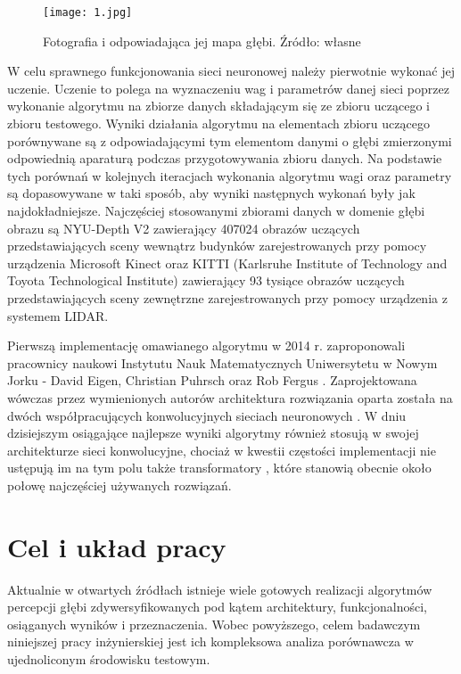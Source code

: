 \begin{figure}[H]
        \centering
        \texttt{[image: 1.jpg]}
        \caption{Fotografia i odpowiadająca jej mapa głębi. Źródło: własne}
        \label{fig:depthmap}
 \end{figure}

W celu sprawnego funkcjonowania sieci neuronowej należy pierwotnie wykonać jej uczenie. Uczenie to polega na wyznaczeniu wag i parametrów danej sieci poprzez wykonanie algorytmu na zbiorze danych składającym się ze zbioru uczącego i zbioru testowego. Wyniki działania algorytmu na elementach zbioru uczącego porównywane są z odpowiadającymi tym elementom danymi o głębi zmierzonymi odpowiednią aparaturą podczas przygotowywania zbioru danych. Na podstawie tych porównań w kolejnych iteracjach wykonania algorytmu wagi oraz parametry są dopasowywane w taki sposób, aby wyniki następnych wykonań były jak najdokładniejsze. Najczęściej stosowanymi zbiorami danych w domenie głębi obrazu są NYU-Depth V2 \cite{couprie2013} zawierający 407024 obrazów uczących przedstawiających sceny wewnątrz budynków zarejestrowanych przy pomocy urządzenia Microsoft Kinect oraz KITTI (Karlsruhe Institute of Technology and Toyota Technological Institute) \cite{geiger2012} zawierający 93 tysiące obrazów uczących przedstawiających sceny zewnętrzne zarejestrowanych przy pomocy urządzenia z systemem LIDAR.

Pierwszą implementację omawianego algorytmu w 2014 r. zaproponowali pracownicy naukowi Instytutu Nauk Matematycznych Uniwersytetu w Nowym Jorku - David Eigen, Christian Puhrsch oraz Rob Fergus \cite{eigen2014}. Zaprojektowana wówczas przez wymienionych autorów architektura rozwiązania oparta została na dwóch współpracujących konwolucyjnych sieciach neuronowych \cite{oshea2015}. W dniu dzisiejszym osiągające najlepsze wyniki algorytmy również stosują w swojej architekturze sieci konwolucyjne, chociaż w kwestii częstości implementacji nie ustępują im na tym polu także transformatory \cite{vaswani2017}, które stanowią obecnie około połowę najczęściej używanych rozwiązań.

\section{Cel i układ pracy}
Aktualnie w otwartych źródłach istnieje wiele gotowych realizacji algorytmów percepcji głębi zdywersyfikowanych pod kątem architektury, funkcjonalności, osiąganych wyników i przeznaczenia. Wobec powyższego, celem badawczym niniejszej pracy inżynierskiej jest ich kompleksowa analiza porównawcza w ujednoliconym środowisku testowym.

